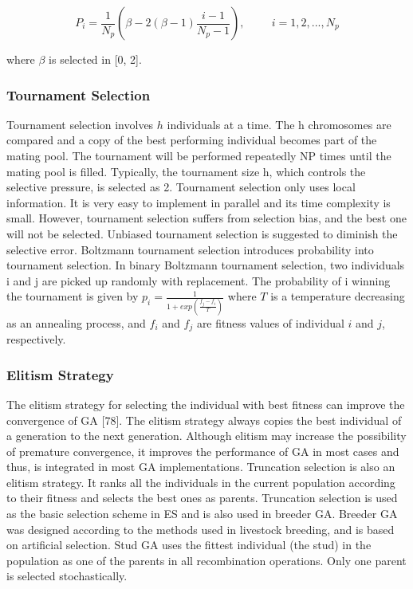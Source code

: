 \documentclass[14pt]{article}
\numberwithin{equation}{subsection}
\begin{document}
			\[P_i = \frac{1}{N_p}(\beta-2(\beta-1)\frac{i-1}{N_p-1}), \hspace{1cm} i = 1,2,...,N_p\]
			
			where $\beta$ is selected in [0, 2].
			
			\subsubsection{Tournament Selection} Tournament selection involves $h$ individuals at a time. The h
			chromosomes are compared and a copy of the best performing individual becomes part of the mating pool. The
			tournament will be performed repeatedly NP times until the mating pool is filled. Typically, the tournament
			size h, which controls the selective pressure, is selected as 2. Tournament selection only uses local
			information. It is very easy to implement in parallel and its time complexity is small. However, tournament
			selection suffers from selection bias, and the best one will not be selected. Unbiased tournament selection
			is suggested to diminish the selective error. Boltzmann tournament selection introduces probability into
			tournament selection. In binary Boltzmann tournament selection, two individuals i and j are picked up
			randomly with replacement. The probability of i winning the tournament is given by 
			$p_i = \frac{1}{1+exp( \frac{f_j-f_i}{T})}$
			 where $T$ is a temperature decreasing as an annealing process, and $f_i$ and $f_j$ are fitness values of
			individual $i$ and $j$, respectively.
			
			\subsubsection{Elitism Strategy}The elitism strategy for selecting the individual with best fitness can improve
			the convergence of GA [78]. The elitism strategy always copies the best individual of a generation to the
			next generation. Although elitism may increase the possibility of premature convergence, it improves the
			performance of GA in most cases and thus, is integrated in most GA implementations. Truncation selection is
			also an elitism strategy. It ranks all the individuals in the current population according to their fitness
			and selects the best ones as parents. Truncation selection is used as the basic selection scheme in ES and is
			also used in breeder GA. Breeder GA was designed according to the methods used in livestock breeding, and is
			based on artificial selection. Stud GA uses the fittest individual (the stud) in the population as one
			of the parents in all recombination operations. Only one parent is selected stochastically.
			
\end{document}
